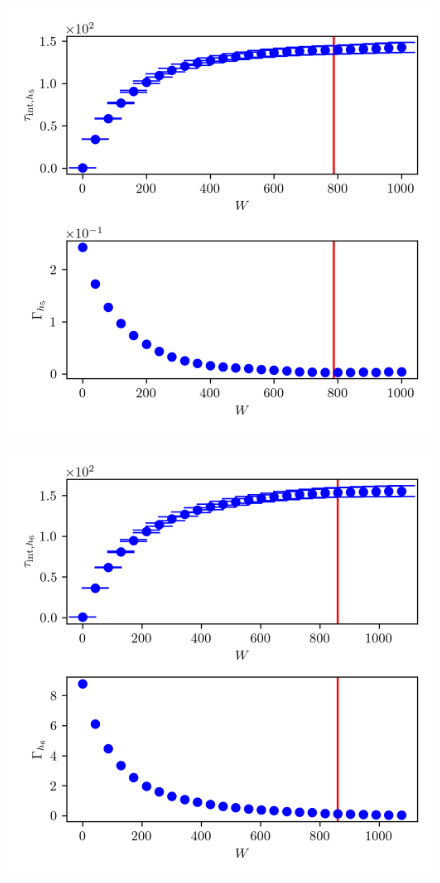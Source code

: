 \begin{figure}[ht!]
	\centering
	\includegraphics{UwerrTauIntTWalk4.png}
	\caption[]{}
	\label{fig:}
\end{figure}


\begin{figure}[ht!]
	\centering
	\includegraphics{UwerrTauIntTWalk5.png}
	\caption[]{}
	\label{fig:}
\end{figure}


